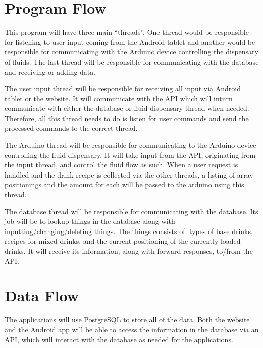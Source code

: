 {    \section{Program Flow}
        This program will have three main ``threads''. One thread would be 
        responsible for listening to user input coming from the Android 
        tablet and another would be responsible for communicating with the 
        Arduino device controlling the dispensary of fluids. The last thread 
        will be responsible for communicating with the database and 
        receiving or adding data.

        The user input thread will be responsible for receiving all input 
        via Android tablet or the website. It will communicate with the API 
        which will inturn communicate with either the database or fluid 
        dispensary thread when needed. Therefore, all this thread needs to 
        do is listen for user commands and send the processed commands to 
            the correct thread.

        The Arduino thread will be responsible for communicating to the 
        Arduino device controlling the fluid dispensary. It will take input 
        from the API, originating from the input thread, and control the 
        fluid flow as such. When a user request is handled and the drink 
        recipe is collected via the other threads, a listing of array 
        positionings and the amount for each will be passed to the arduino 
        using this thread.

        The database thread will be responsible for communicating with the 
        database. Its job will be to lookup things in the database along 
        with inputting/changing/deleting things. The things consists of: 
        types of base drinks, recipes for mixed drinks, and the current 
        positioning of the currently loaded drinks. It will receive its 
        information, along with forward responses, to/from the API.

    \section{Data Flow}
        The applications will use PostgreSQL to store all of the data. Both 
        the website and the Android app will be able to access the 
        information in the database via an API, which will interact with the 
        database as needed for the applications.

}
